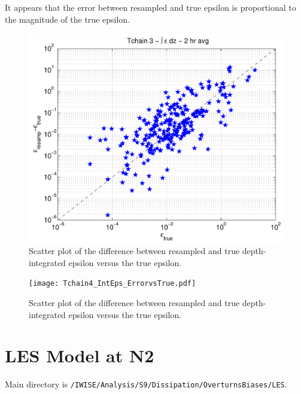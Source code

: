 \documentclass[11pt]{article}
\begin{document}
It appears that the error between resampled and true epsilon is proportional to the magnitude of the true epsilon.

\begin{figure}[htbp]
\includegraphics[scale=0.8]{Tchain3_IntEps_ErrorvsTrue.pdf}
\caption{Scatter plot of the difference between resampled and true depth-integrated epsilon versus the true epsilon.}
\label{}
\end{figure}

\begin{figure}[htbp]
\texttt{[image: Tchain4\_IntEps\_ErrorvsTrue.pdf]}
\caption{Scatter plot of the difference between resampled and true depth-integrated epsilon versus the true epsilon.}
\label{}
\end{figure}



\newpage
\clearpage
\section{LES Model at N2}

Main directory is \verb+/IWISE/Analysis/S9/Dissipation/OverturnsBiases/LES+. 
\end{document}
